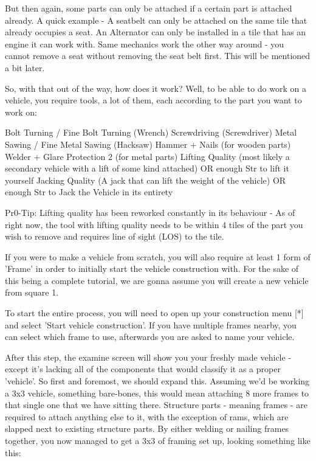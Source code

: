 But then again, some parts can only be attached if a certain part is attached already. A quick example - A seatbelt can only be attached on the same tile that already occupies a seat. An Alternator can only be installed in a tile that has an engine it can work with. Same mechanics work the other way around - you cannot remove a seat without removing the seat belt first. This will be mentioned a bit later.

So, with that out of the way, how does it work? Well, to be able to do work on a vehicle, you require tools, a lot of them, each according to the part you want to work on:

Bolt Turning / Fine Bolt Turning (Wrench)
Screwdriving (Screwdriver)
Metal Sawing / Fine Metal Sawing (Hacksaw)
Hammer + Nails (for wooden parts)
Welder + Glare Protection 2 (for metal parts)
Lifting Quality (most likely a secondary vehicle with a lift of some kind attached) OR enough Str to lift it yourself
Jacking Quality (A jack that can lift the weight of the vehicle) OR enough Str to Jack the Vehicle in its entirety

Pr0-Tip: Lifting quality has been reworked constantly in its behaviour - As of right now, the tool with lifting quality needs to be within 4 tiles of the part you wish to remove and requires line of sight (LOS) to the tile.

If you were to make a vehicle from scratch, you will also require at least 1 form of 'Frame' in order to initially start the vehicle construction with. For the sake of this being a complete tutorial, we are gonna assume you will create a new vehicle from square 1.

To start the entire process, you will need to open up your construction menu [*] and select 'Start vehicle construction'. If you have multiple frames nearby, you can select which frame to use, afterwards you are asked to name your vehicle.

After this step, the examine screen will show you your freshly made vehicle - except it's lacking all of the components that would classify it as a proper 'vehicle'. So first and foremost, we should expand this. Assuming we'd be working a 3x3 vehicle, something bare-bones, this would mean attaching 8 more frames to that single one that we have sitting there. Structure parts - meaning frames - are required to attach anything else to it, with the exception of rams, which are slapped next to existing structure parts. By either welding or nailing frames together, you now managed to get a 3x3 of framing set up, looking something like this:

